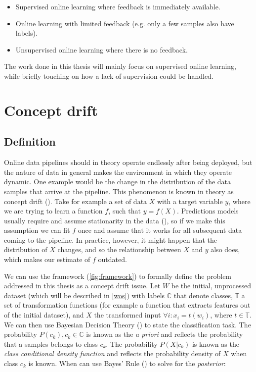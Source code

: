 \documentclass[12pt]{extreport}
\begin{document}
\begin{itemize}
    \item Supervised online learning where feedback is immediately available.
    \item Online learning with limited feedback (e.g. only a few samples also have labels).
    \item Unsupervised online learning where there is no feedback.
\end{itemize}

The work done in this thesis will mainly focus on supervised online learning, while briefly touching on how a lack of supervision could be handled.

\section{Concept drift} \label{concept-drift}

\subsection{Definition}

Online data pipelines should in theory operate endlessly after being deployed, but the nature of data in general makes the environment in which they operate dynamic. One example would be the change in the distribution of the data samples that arrive at the pipeline. This phenomenon is known in theory as concept drift (\cite{survey-concept-drift}). Take for example a set of data $X$ with a target variable $y$, where we are trying to learn a function $f$, such that $y = f(X)$. Predictions models usually require and assume stationarity in the data (\cite{Heng_Wang_2015}), so if we make this assumption we can fit $f$ once and assume that it works for all subsequent data coming to the pipeline. In practice, however, it might happen that the distribution of $X$ changes, and so the relationship between $X$ and $y$ also does, which makes our estimate of $f$ outdated.

We can use the framework (\ref{fig:framework}) to formally define the problem addressed in this thesis as a concept drift issue. Let $W$ be the initial, unprocessed dataset (which will be described in \ref{wos}) with labels $\mathbb{C}$ that denote classes, $\mathbb{T}$ a set of transformation functions (for example a function that extracts features out of the initial dataset), and $X$ the transformed input $\forall i: x_i = t(w_i)$, where $t \in \mathbb{T}$. We can then use Bayesian Decision Theory (\cite{pattern-classification}) to state the classification task. The probability $P(c_k), c_k \in \mathbb{C}$ is known as the \emph{a priori} and reflects the probability that a samples belongs to class $c_k$. The probability $P(X|c_k)$ is known as the \emph{class conditional density function} and reflects the probability density of $X$ when class $c_k$ is known. When can use Bayes' Rule (\cite{bayesrule}) to solve for the \emph{posterior}:
\end{document}
